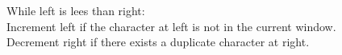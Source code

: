 \documentclass[preview]{standalone}
\begin{document}
While left is lees than right:\\Increment left if the character at left is not in the current window.\\Decrement right if there exists a duplicate character at right.\\
\end{document}
